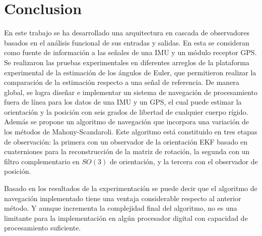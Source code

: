 \documentclass[conference]{IEEEtran}
\begin{document}
%
\section{Conclusion}
En este trabajo se ha desarrollado una arquitectura en cascada de observadores basados en el análisis funcional de sus entradas y salidas. En esta se consideran como fuente de información a las señales de una IMU y un módulo receptor GPS. Se realizaron las pruebas experimentales en diferentes arreglos de la plataforma experimental de la estimación de los ángulos de Euler, que permitieron realizar la comparación de la estimación respecto a una señal de referencia. De manera global, se logra diseñar e implementar un sistema de navegación de procesamiento fuera de línea para los datos de una IMU y un GPS, el cual puede estimar la orientación y la posición con seis grados de libertad de cualquier cuerpo rígido. Además se propone un algoritmo de navegación que incorpora una variación de los métodos de Mahony-Scandaroli. Este algoritmo está constituido en tres etapas de observación: la primera con un observador de la orientación EKF basado en cuaterniones para la reconstrucción de la matriz de rotación, la segunda con un filtro complementario en $SO(3)$ de orientación, y la tercera con el observador de posición.
\par
Basado en los resultados de la experimentación se puede decir que el algoritmo de navegación implementado tiene una ventaja considerable respecto al anterior método. Y aunque incrementa la complejidad final del algoritmo, no es una limitante para la implementación en algún procesador digital con capacidad de procesamiento suficiente.\par
\end{document}
